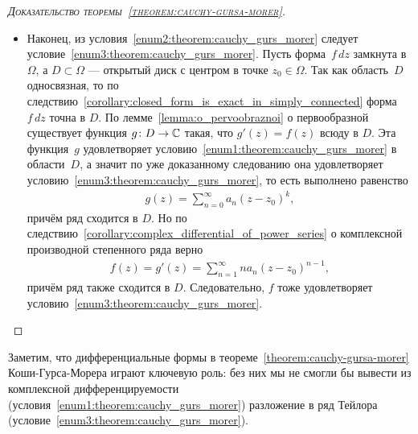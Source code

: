 \documentclass[../complex-analysis.tex]{subfiles}
\begin{document}
\begin{proof}[\normalfont\textsc{Доказательство теоремы~\ref{theorem:cauchy-gursa-morer}}]
\begin{itemize}
  \item Наконец, из условия~\ref{enum2:theorem:cauchy_gurs_morer} следует условие~\ref{enum3:theorem:cauchy_gurs_morer}. Пусть форма~$ f\,dz $ замкнута в $ \Omega $, а $ D \subset \Omega $ --- открытый диск с центром в точке $z_0 \in \Omega $. Так как область~$ D $ односвязная, то по следствию~\ref{corollary:closed_form_is_exact_in_simply_connected} форма~$ f\,dz $ точна в $ D $. По лемме~\ref{lemma:o_pervoobraznoi} о первообразной существует функция $ g\colon D\to\mathbb{C} $ такая, что $ g'(z) = f(z) $ всюду в $ D $. Эта функция~$ g $ удовлетворяет условию~\ref{enum1:theorem:cauchy_gurs_morer} в области~$ D $, а значит по уже доказанному следованию она удовлетворяет условию~\ref{enum3:theorem:cauchy_gurs_morer}, то есть выполнено равенство
   \begin{align*}
    g(z) = \sum_{n=0}^{\infty} a_n(z-z_0)^{k},
   \end{align*} причём ряд сходится в $ D $. Но по следствию~\ref{corollary:complex_differential_of_power_series} о комплексной производной степенного ряда верно
   \begin{align*}
    f(z) = g'(z) = \sum_{n=1}^{\infty}na_n(z-z_0)^{n-1},
   \end{align*} причём ряд также сходится в $ D $. Следовательно, $ f $ тоже удовлетворяет условию~\ref{enum3:theorem:cauchy_gurs_morer}.
 \end{itemize}
\end{proof}

Заметим, что дифференциальные формы в теореме~\ref{theorem:cauchy-gursa-morer} Коши-Гурса-Морера играют ключевую роль: без них мы не смогли бы вывести из комплексной дифференцируемости (условия~\ref{enum1:theorem:cauchy_gurs_morer}) разложение в ряд Тейлора (условие~\ref{enum3:theorem:cauchy_gurs_morer}).
\end{document}

